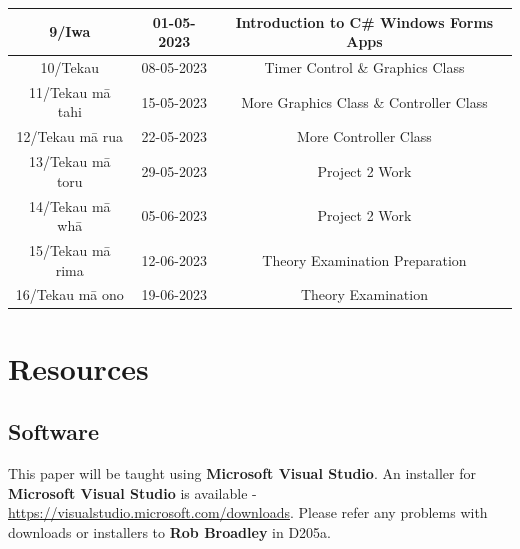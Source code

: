 \documentclass{article}
\begin{document}
\begin{tabular}{|c|c|c|c|}
	\footnotesize 9/Iwa            & \footnotesize 01-05-2023 & \multicolumn{2}{c|}{\footnotesize Introduction to C\# Windows Forms Apps}                                                                 \\ \hline
	\footnotesize 10/Tekau         & \footnotesize 08-05-2023 & \multicolumn{2}{c|}{\footnotesize Timer Control \& Graphics Class}                                                                 \\ \hline
	\footnotesize 11/Tekau mā tahi & \footnotesize 15-05-2023 & \multicolumn{2}{c|}{\footnotesize More Graphics Class \& Controller Class}                                                                 \\ \hline
	\footnotesize 12/Tekau mā rua  & \footnotesize 22-05-2023 & \multicolumn{2}{c|}{\footnotesize More Controller Class}                                                                 \\ \hline
	\footnotesize 13/Tekau mā toru & \footnotesize 29-05-2023 & \multicolumn{2}{c|}{\footnotesize Project 2 Work}                                                     \\ \hline
	\footnotesize 14/Tekau mā whā  & \footnotesize 05-06-2023 & \multicolumn{2}{c|}{\footnotesize Project 2 Work} \\ \hline 
	\footnotesize 15/Tekau mā rima & \footnotesize 12-06-2023 & \multicolumn{2}{c|}{\footnotesize Theory Examination Preparation}                                                       \\ \hline
	\footnotesize 16/Tekau mā ono  & \footnotesize 19-06-2023 & \multicolumn{2}{c|}{\footnotesize Theory Examination}                                                         \\ \hline
\end{tabular}

\section*{Resources}

\subsection*{Software}
This paper will be taught using \textbf{Microsoft Visual Studio}. An installer for \textbf{Microsoft Visual Studio} is available - \href{https://visualstudio.microsoft.com/downloads}{https://visualstudio.microsoft.com/downloads}. Please refer any problems with downloads or installers to \textbf{Rob Broadley} in D205a.
\end{document}
